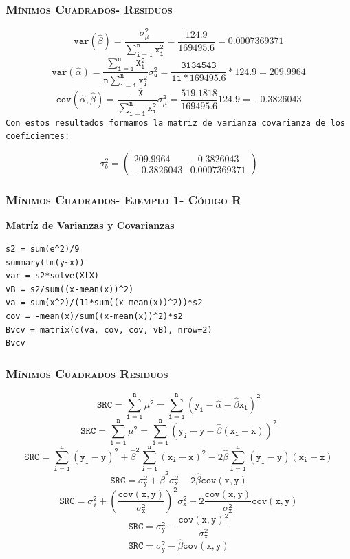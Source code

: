 \documentclass[16.5pt]{beamer}
\begin{document}
{
\begin{frame}
\frametitle{\textsc{Mínimos Cuadrados- Residuos}}
\hspace*{-5mm}
\vspace*{-5mm} 

$$\mathtt{var(\hat\beta)= \frac{\sigma_{\mu}^2}{\sum_{i=1}^n x_i^2}= \frac{124.9}{169495.6}= 0.0007369371} $$
$$\mathtt{ var(\hat\alpha)= \frac{\sum_{i=1}^nX_i^2}{n\sum_{i=1}^n x_i^2}\sigma_u^2 =\frac{3134543}{11*169495.6}*124.9 =209.9964}$$
$$\mathtt{ cov(\hat{\alpha}, \hat{\beta})=  \frac{-\overline{X}}{\sum_{i=1}^n x_i^2}\sigma_{\mu}^2 = \frac{519.1818}{169495.6}124.9} =-0.3826043$$
\texttt{Con estos resultados formamos la matriz de varianza covarianza de los coeficientes: }

$$\sigma_b^2 = \begin{pmatrix} 209.9964 &  -0.3826043 \\ -0.3826043 & 0.0007369371 \end{pmatrix}$$

\end{frame}
}
{
\begin{frame}
\frametitle{\textsc{Mínimos Cuadrados- Ejemplo 1- Código R}}

\textbf{Matríz de Varianzas y Covarianzas}
\begin{lstlisting}
s2 = sum(e^2)/9
summary(lm(y~x))
var = s2*solve(XtX)
vB = s2/sum((x-mean(x))^2)
va = sum(x^2)/(11*sum((x-mean(x))^2))*s2
cov = -mean(x)/sum((x-mean(x))^2)*s2
Bvcv = matrix(c(va, cov, cov, vB), nrow=2)
Bvcv 

\end{lstlisting}

\end{frame}
}

{
\begin{frame}
\frametitle{\textsc{Mínimos Cuadrados Residuos}}
\hspace*{-5mm}
\vspace*{-5mm} 


$$\mathtt{ SRC = \sum_{i=1}^n \mu^2 = \sum_{i=1}^n (y_i -\hat\alpha -\hat\beta x_i)^2 }$$
$$\mathtt{ SRC = \sum_{i=1}^n \mu^2 = \sum_{i=1}^n (y_i -\overline{y} - \hat\beta (x_i-\overline{x}))^2 }$$
$$\mathtt{ SRC  = \sum_{i=1}^n (y_i -\overline{y})^2 + \hat\beta^2\sum_{i=1}^n (x_i-\overline{x})^2 - 2\hat{\beta}\sum_{i=1}^n (y_i-\overline{y})(x_i-\overline{x}) }$$
$$\mathtt{ SRC  = \sigma_y^2 + \hat\beta^2\sigma_x^2-2\hat\beta cov(x,y)}$$
$$\mathtt{ SRC  = \sigma_y^2 + (\frac{cov(x,y)}{\sigma_x^2})^2\sigma_x^2-2\frac{cov(x,y)}{\sigma_x^2} cov(x,y)}$$
$$\mathtt{ SRC  = \sigma_y^2 - \frac{cov(x,y)^2}{\sigma_x^2}}$$
$$\mathtt{\boxed{ SRC  = \sigma_y^2 -\hat\beta cov(x,y)}}$$
\end{frame}
}
\end{document}
